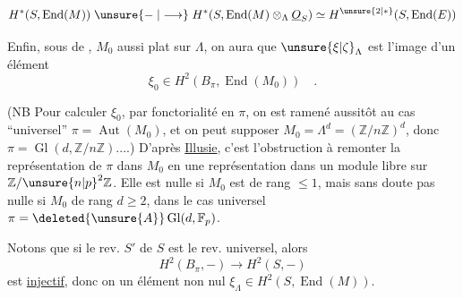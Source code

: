 \[
H^*(S,\operatorname{End}(M))\mathrel{\unsure{\relbar|\longrightarrow}}
H^*(S,\operatorname{End}(M)\otimes_{\Lambda}\underline{O}_S)\simeq H^{\unsure{2|*}}(S,\operatorname{End}(E))
\]

Enfin, sous  de , $M_0$  aussi plat sur $\Lambda$, on aura que $\unsure{\xi|\zeta}_{\Lambda}$ est l'image d'un élément
\[
\xi_0\in H^2(B_{\pi},\operatorname{End}(M_0))\quad .
\]

(NB Pour calculer $\xi_0$, par fonctorialité en $\pi$, on est ramené aussitôt au cas ``universel'' $\pi=\operatorname{Aut}(M_0)$, et on peut  supposer $M_0=\Lambda^d=(\mathbb Z/n\mathbb Z)^d$, donc $\pi=\operatorname{Gl}(d,\mathbb Z/n\mathbb Z)$....) D'après \uline{Illusie}, c'est l'obstruction à remonter la représentation de $\pi$ dans $M_0$ en une représentation dans un module libre sur $\mathbb Z/\unsure{n|p}^2\mathbb Z$.  Elle est  nulle si $M_0$ est de rang $\leq 1$, mais sans doute pas nulle si $M_0$ de rang $d\geq 2$, dans le cas universel $\pi=\deleted{\unsure{A}}\operatorname{Gl}(d,\mathbb F_p)$.

Notons que si le rev. $S'$ de $S$ est le rev. universel, alors
\[
H^2(B_{\pi},-)\longrightarrow H^2(S,-)
\]
est \uline{injectif}, donc on  un élément non nul  $\xi_{\Lambda}\in H^2(S,\operatorname{End}(M))$.
